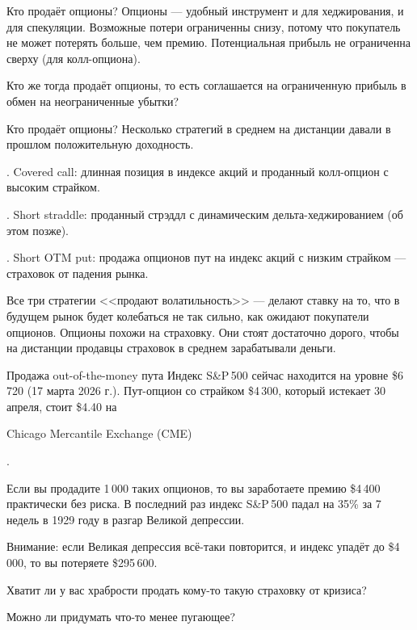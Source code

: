 \documentclass{beamer}
\newcommand{\en}[1]{\begin{otherlanguage}{english}#1\end{otherlanguage}}
\begin{document}
\begin{frame}{Кто продаёт опционы?}
\justify
Опционы --- удобный инструмент и для хеджирования, и для спекуляции. Возможные потери 
ограниченны снизу, потому что покупатель не может потерять больше, чем премию. Потенциальная прибыль не ограниченна сверху (для колл-опциона).

\justify
Кто же тогда продаёт опционы, то есть соглашается на ограниченную прибыль в обмен на 
неограниченные убытки?
\end{frame}



\begin{frame}{Кто продаёт опционы?}
\justify
Несколько стратегий в среднем на дистанции давали в прошлом положительную доходность.

. Covered call: длинная позиция в индексе акций и проданный колл-опцион с высоким страйком.

. Short straddle: проданный стрэддл с динамическим дельта-хеджированием (об этом позже).

. Short OTM put: продажа опционов пут на индекс акций с низким страйком --- страховок от падения рынка.

\justify
Все три стратегии <<продают волатильность>> --- делают ставку на то, что в будущем рынок будет колебаться не так сильно, как ожидают покупатели опционов. Опционы похожи на страховку. Они стоят достаточно дорого, чтобы на дистанции продавцы страховок в среднем зарабатывали деньги.
\end{frame}



\begin{frame}{Продажа out-of-the-money пута}
\justify
Индекс S\&P\,500 сейчас находится на уровне \$6\,720 (17 марта 2026 г.). Пут-опцион со страйком \$4\,300, который истекает 30 апреля, стоит \$4.40 на \en{Chicago Mercantile Exchange (CME)}.

\justify
Если вы продадите 1\,000 таких опционов, то вы заработаете премию \$4\,400 практически без риска. В последний раз индекс S\&P\,500 падал на 35\% за 7 недель в 1929 году в разгар Великой депрессии.

\justify
Внимание: если Великая депрессия всё-таки повторится, и индекс упадёт до \$4\,000, то вы потеряете \$295\,600.

\justify
Хватит ли у вас храбрости продать кому-то такую страховку от кризиса?

\justify
Можно ли придумать что-то менее пугающее?
\end{frame}
\end{document}
